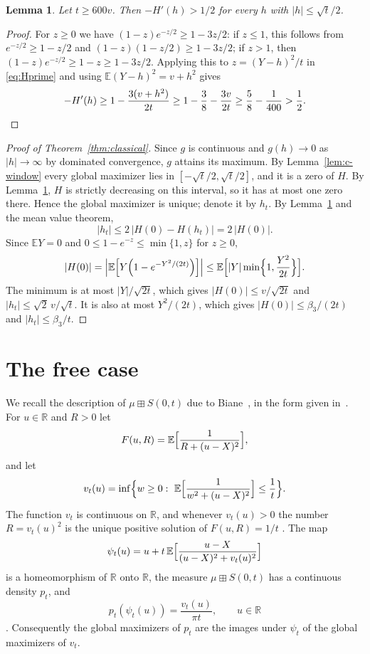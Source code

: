 \documentclass[11pt]{amsart}
\newtheorem{lemma}[theorem]{Lemma}
\theoremstyle{definition}
\newcommand{\E}{\mathbb{E}}
\newcommand{\R}{\mathbb{R}}
\begin{document}
\begin{lemma}\label{lem:c-slope}
Let $t\ge 600v$. Then $-H'(h)>1/2$ for every $h$ with $|h|\le\sqrt t/2$.
\end{lemma}

\begin{proof}
For $z\ge0$ we have $(1-z)e^{-z/2}\ge1-3z/2$: if $z\le1$, this follows from $e^{-z/2}\ge1-z/2$ and
$(1-z)(1-z/2)\ge1-3z/2$; if $z>1$, then $(1-z)e^{-z/2}\ge1-z\ge1-3z/2$. Applying this to $z=(Y-h)^2/t$
in \eqref{eq:Hprime} and using $\E(Y-h)^2=v+h^2$ gives
\[
-H'(h)\ge1-\frac{3(v+h^2)}{2t}\ge1-\frac{3}{8}-\frac{3v}{2t}\ge\frac58-\frac1{400}>\frac12 .\qedhere
\]
\end{proof}

\begin{proof}[Proof of Theorem~\ref{thm:classical}]
Since $g$ is continuous and $g(h)\to0$ as $|h|\to\infty$ by dominated convergence, $g$ attains its maximum. By
Lemma~\ref{lem:c-window} every global maximizer lies in $[-\sqrt t/2,\sqrt t/2]$, and it is a zero of $H$. By
Lemma~\ref{lem:c-slope}, $H$ is strictly decreasing on this interval, so it has at most one zero there. Hence the
global maximizer is unique; denote it by $h_t$. By Lemma~\ref{lem:c-slope} and the mean value theorem,
\begin{equation}\label{eq:c-mvt}
|h_t|\le2\,|H(0)-H(h_t)|=2\,|H(0)|.
\end{equation}
Since $\E Y=0$ and $0\le1-e^{-z}\le\min\{1,z\}$ for $z\ge0$,
\begin{equation}\label{eq:c-H0}
|H(0)|=\Bigl|\E\Bigl[Y\Bigl(1-e^{-Y^2/(2t)}\Bigr)\Bigr]\Bigr|\le\E\Bigl[|Y|\min\Bigl\{1,\frac{Y^2}{2t}\Bigr\}\Bigr].
\end{equation}
The minimum is at most $|Y|/\sqrt{2t}$, which gives $|H(0)|\le v/\sqrt{2t}$ and $|h_t|\le\sqrt2\,v/\sqrt t$. It is
also at most $Y^2/(2t)$, which gives $|H(0)|\le\beta_3/(2t)$ and $|h_t|\le\beta_3/t$.
\end{proof}

\section{The free case}\label{sec:free}

We recall the description of $\mu\boxplus S(0,t)$ due to Biane~\cite{Biane}, in the form given
in~\cite[Section~2.2]{HU}. For $u\in\R$ and $R>0$ let
\[
F(u,R)=\E\Bigl[\frac{1}{R+(u-X)^2}\Bigr],
\]
and let
\[
v_t(u)=\inf\Bigl\{w\ge0:\ \E\Bigl[\frac1{w^2+(u-X)^2}\Bigr]\le\frac1t\Bigr\}.
\]
The function $v_t$ is continuous on $\R$, and whenever $v_t(u)>0$ the number $R=v_t(u)^2$ is the unique positive
solution of $F(u,R)=1/t$ \cite[(2.8)--(2.10)]{HU}. The map
\[
\psi_t(u)=u+t\,\E\Bigl[\frac{u-X}{(u-X)^2+v_t(u)^2}\Bigr]
\]
is a homeomorphism of $\R$ onto $\R$, the measure $\mu\boxplus S(0,t)$ has a continuous density $p_t$, and
\begin{equation}\label{eq:biane}
p_t(\psi_t(u))=\frac{v_t(u)}{\pi t},\qquad u\in\R
\end{equation}
\cite[(2.13) and (2.14)]{HU}. Consequently the global maximizers of $p_t$ are the images under $\psi_t$ of the global
maximizers of $v_t$.
\end{document}
